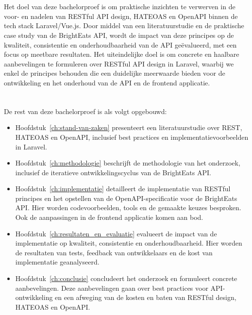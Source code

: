 \section{}%
\label{sec:onderzoeksdoelstelling}

Het doel van deze bachelorproef is om praktische inzichten te verwerven in de voor- en nadelen van RESTful API design, HATEOAS en OpenAPI binnen de tech stack Laravel/Vue.js. Door middel van een literatuurstudie en de praktische case study van de BrightEats API, wordt de impact van deze principes op de kwaliteit, consistentie en onderhoudbaarheid van de API geëvalueerd, met een focus op meetbare resultaten. Het uiteindelijke doel is om concrete en haalbare aanbevelingen te formuleren over RESTful API design in Laravel, waarbij we enkel de principes behouden die een duidelijke meerwaarde bieden voor de ontwikkeling en het onderhoud van de API en de frontend applicatie.

\section{}%
\label{sec:opzet-bachelorproef}


De rest van deze bachelorproef is als volgt opgebouwd:

\begin{itemize}
  \item Hoofdstuk~\ref{ch:stand-van-zaken} presenteert een literatuurstudie over REST, HATEOAS en OpenAPI, inclusief best practices en implementatievoorbeelden in Laravel.
  \item Hoofdstuk~\ref{ch:methodologie} beschrijft de methodologie van het onderzoek, inclusief de iteratieve ontwikkelingscyclus van de BrightEats API.
  \item Hoofdstuk~\ref{ch:implementatie} detailleert de implementatie van RESTful principes en het opstellen van de OpenAPI-specificatie voor de BrightEats API. Hier worden codevoorbeelden, tools en de gemaakte keuzes besproken. Ook de aanpassingen in de frontend applicatie komen aan bod.
  \item Hoofdstuk~\ref{ch:resultaten_en_evaluatie} evalueert de impact van de implementatie op kwaliteit, consistentie en onderhoudbaarheid. Hier worden de resultaten van tests, feedback van ontwikkelaars en de kost van implementatie geanalyseerd.
  \item Hoofdstuk~\ref{ch:conclusie} concludeert het onderzoek en formuleert concrete aanbevelingen. Deze aanbevelingen gaan over best practices voor API-ontwikkeling en een afweging van de kosten en baten van RESTful design, HATEOAS en OpenAPI.
\end{itemize}
